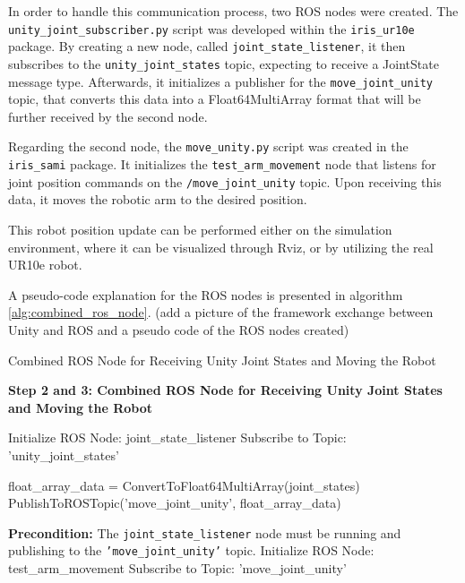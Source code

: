 \begin{itemize}
    In order to handle this communication process, two ROS nodes were created. 
    The \texttt{unity\_joint\_subscriber.py} script was developed within the \texttt{iris\_ur10e} package.
    By creating a new node, called \texttt{joint\_state\_listener}, it then subscribes to the \texttt{unity\_joint\_states} topic, expecting to receive a JointState message type.
    Afterwards, it initializes a publisher for the \texttt{move\_joint\_unity} topic, that converts this data into a Float64MultiArray format that will be further received by the second node.
    
    Regarding the second node, the \texttt{move\_unity.py} script was created in the \texttt{iris\_sami} package. It initializes the \texttt{test\_arm\_movement} node that listens for joint position commands on the \texttt{/move\_joint\_unity} topic.
    Upon receiving this data, it moves the robotic arm to the desired position.

    This robot position update can be performed either on the simulation environment, where it can be visualized through Rviz, or by utilizing the real UR10e robot. 

    A pseudo-code explanation for the ROS nodes is presented in algorithm \ref{alg:combined_ros_node}.
    (add a picture of the framework exchange between Unity and ROS and a pseudo code of the ROS nodes created)



    \begin{algorithm}
        \caption{Combined ROS Node for Receiving Unity Joint States and Moving the Robot}\label{alg:combined_ros_node}
        \begin{algorithmic}[1]
            \State \textbf{Step 2 and 3: Combined ROS Node for Receiving Unity Joint States and Moving the Robot}
            
            \State Initialize ROS Node: joint\_state\_listener
            \State Subscribe to Topic: 'unity\_joint\_states'
            
                \State float\_array\_data = ConvertToFloat64MultiArray(joint\_states)
                \State PublishToROSTopic('move\_joint\_unity', float\_array\_data)
            \EndWhile
            
            \State \textbf{Precondition:} The \texttt{joint\_state\_listener} node must be running and publishing to the \texttt{'move\_joint\_unity'} topic.
            \State Initialize ROS Node: test\_arm\_movement
            \State Subscribe to Topic: 'move\_joint\_unity'
            

\end{algorithmic}
\end{algorithm}
\end{itemize}
